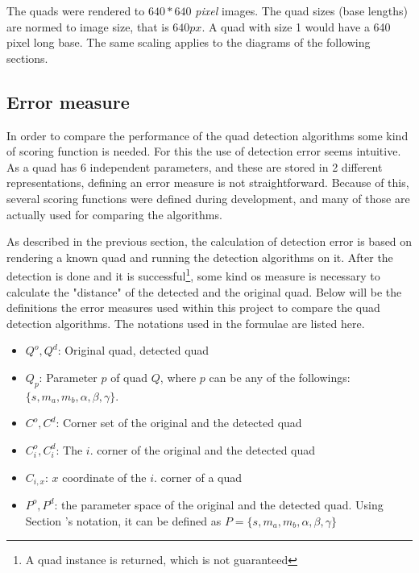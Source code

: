The quads were rendered to $640*640$ \textit{pixel} images.
The quad sizes (base lengths) are normed to image size, that is $640 px$.
A quad with size 1 would have a 640 pixel long base.
The same scaling applies to the diagrams of the following sections. 

\subsection{Error measure}

In order to compare the performance of the quad detection algorithms some kind of scoring function is needed.
For this the use of detection error seems intuitive.
As a quad has 6 independent parameters, and these are stored in 2 different representations, defining an error measure is not straightforward.
Because of this, several scoring functions were defined during development, and many of those are actually used for comparing the algorithms.

As described in the previous section, the calculation of detection error is based on rendering a known quad and running the detection algorithms on it.
After the detection is done and it is successful\footnote{A quad instance is returned, which is not guaranteed}, some kind os measure is necessary to calculate the "distance" of the detected and the original quad.
Below will be the definitions the error measures used within this project to compare the quad detection algorithms.
The notations used in the formulae are listed here.
\begin{itemize}
	\item $Q^o, Q^d$: Original quad, detected quad
	\item $Q_p$: Parameter $p$ of quad $Q$, where $p$ can be any of the followings: $\{s, m_a, m_b, \alpha, \beta, \gamma\}$. 
	\item $C^o, C^d$: Corner set of the original and the detected quad
	\item $C_i^o, C_i^d$: The $i.$ corner of the original and the detected quad
	\item $C_{i,x}$: $x$ coordinate of the $i.$ corner of a quad
	\item $P^o, P^d$: the parameter space of the original and the detected quad. Using Section 's notation, it can be defined as $P = \{s, m_a, m_b, \alpha, \beta, \gamma\}$
\end{itemize}

